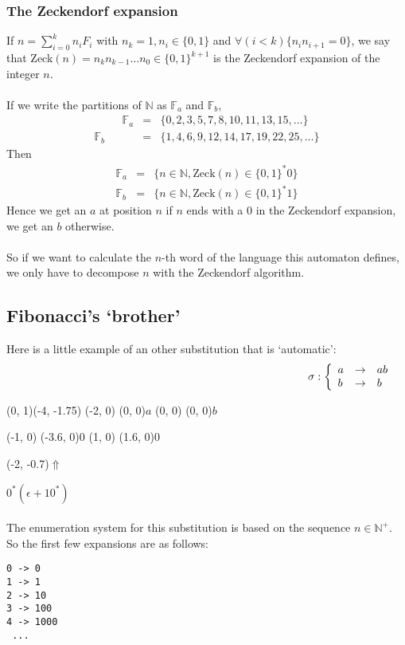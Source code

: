 \documentclass{article}
\begin{document}
\subsubsection{The Zeckendorf expansion}
If $n = \sum_{i = 0}^k n_i F_i$ with $n_k = 1, n_i \in \{0, 1\}$ and
$\forall (i < k) \{n_i n_{i + 1} = 0\}$, we say that
Zeck$(n) = n_k n_{k - 1} \ldots n_0 \in \{0, 1\}^{k + 1}$ is the Zeckendorf
expansion of the integer $n$.\\
\\
If we write the partitions of
$\mathbb{N}$ as $\mathbb{F}_a$ and $\mathbb{F}_b$,
\begin{eqnarray*}
\;\;\;\;\;\;\;\;\;
  \mathbb{F}_a &=& \{0, 2, 3, 5, 7, 8, 10, 11, 13, 15, \ldots\}\\
  \mathbb{F}_b &=& \{1, 4, 6, 9, 12, 14, 17, 19, 22, 25, \ldots\}
\end{eqnarray*}
Then
\begin{eqnarray*}
  \mathbb{F}_a &=& \{n \in \mathbb{N}, \mathrm{Zeck}(n) \in \{0, 1\}^* 0\}\\
  \mathbb{F}_b &=& \{n \in \mathbb{N}, \mathrm{Zeck}(n) \in \{0, 1\}^* 1\}
\end{eqnarray*}
Hence we get an $a$ at position $n$ if $n$ ends with a 0 in the
Zeckendorf expansion, we get an $b$ otherwise.\\
\\
So if we want to calculate the $n$-th word of the language this automaton 
defines, we only have to decompose $n$ with the Zeckendorf algorithm.

\subsection{Fibonacci's `brother'}
Here is a little example of an other substitution that is `automatic':\\
\begin{eqnarray*}
\;\;\;\;\;\;\;\;\;\;\;\;\;\;\;\;\;\;\;\;\;\;\;\;\;\;\;\;\; \;\;\;\;\;\;\;\;\;\;\;\;\;\;\;\;\;\;\;\;\;\;\;\;\;\;\;\;\;\;\;\;\;\;\;\;\;\;\; \;\;\;\;\;\;\;\;\;\;\;\;\;\;\;\;\;\;\;\;\;\;\;\;\;\;
\sigma: \left\{ \begin{array}{lll}
a &\rightarrow& ab\\
b &\rightarrow& b
\end{array} \right.
\end{eqnarray*}
\begin{graph}(0, 1)(-4, -1.75)
  (-2, 0) (0, 0){$a$}
  (0, 0)  (0, 0){$b$}

  (-1, 0) \freetext(-3.6, 0){0}
   
  (1, 0) \freetext(1.6, 0){0}

  \freetext(-2, -0.7){$\Uparrow$}
\end{graph} $0^* (\epsilon + 10^*)$\\
\\
The enumeration system for this substitution is based on the sequence 
$n \in \mathbb{N}^+$. So the first few expansions are as follows:
\begin{verbatim}
0 -> 0
1 -> 1
2 -> 10
3 -> 100
4 -> 1000
 ...
\end{verbatim}
\end{document}
